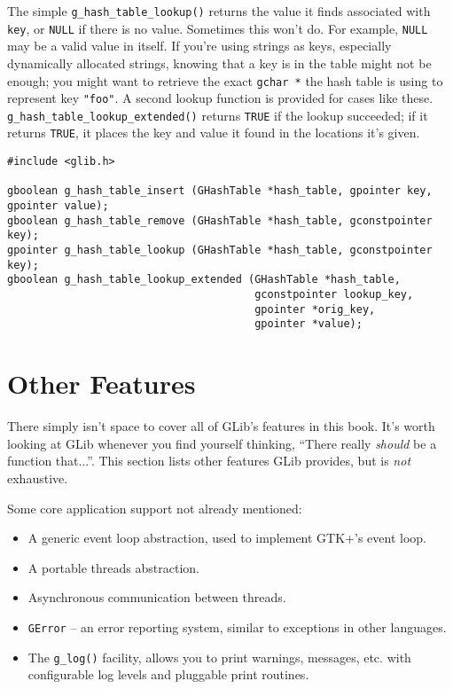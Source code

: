 The simple \lstinline{g_hash_table_lookup()} returns the value it finds associated with \lstinline{key}, or \lstinline{NULL} if there is no value. Sometimes this won't do. For example, \lstinline{NULL} may be a valid value in itself. If you're using strings as keys, especially dynamically allocated strings, knowing that a key is in the table might not be enough; you might want to retrieve the exact \lstinline{gchar *} the hash table is using to represent key \lstinline{"foo"}. A second lookup function is provided for cases like these. \lstinline{g_hash_table_lookup_extended()} returns \lstinline{TRUE} if the lookup succeeded; if it returns \lstinline{TRUE}, it places the key and value it found in the locations it's given.

\begin{lstlisting}[float, caption={Manipulating a \lstinline{GHashTable}}, label=glib-hashmanip]
#include <glib.h>

gboolean g_hash_table_insert (GHashTable *hash_table, gpointer key, gpointer value);
gboolean g_hash_table_remove (GHashTable *hash_table, gconstpointer key);
gpointer g_hash_table_lookup (GHashTable *hash_table, gconstpointer key);
gboolean g_hash_table_lookup_extended (GHashTable *hash_table,
                                       gconstpointer lookup_key,
                                       gpointer *orig_key,
                                       gpointer *value);
\end{lstlisting}

\section{Other Features}

There simply isn't space to cover all of GLib's features in this book. It's worth looking at GLib whenever you find yourself thinking, ``There really \emph{should} be a function that...''. This section lists other features GLib provides, but is \emph{not} exhaustive.

Some core application support not already mentioned:
\begin{itemize}
  \item A generic event loop abstraction, used to implement GTK+'s event loop.
  \item A portable threads abstraction.
  \item Asynchronous communication between threads.
  \item \lstinline{GError} -- an error reporting system, similar to exceptions in other languages.
  \item The \lstinline{g_log()} facility, allows you to print warnings, messages, etc. with configurable log levels and pluggable print routines.
\end{itemize}

